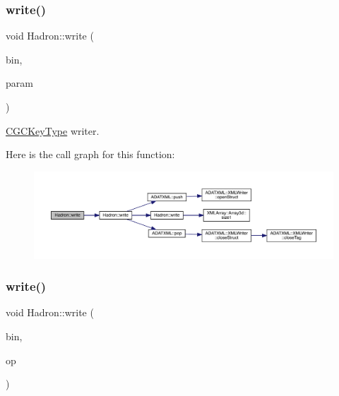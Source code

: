 \subsubsection{\texorpdfstring{write()}{write()}\hspace{0.1cm}{\footnotesize\ttfamily [12/95]}}
{\footnotesize\ttfamily void Hadron\+::write (\begin{DoxyParamCaption}\item[{\mbox{\hyperlink{classADATIO_1_1BinaryWriter}{Binary\+Writer}} \&}]{bin,  }\item[{const \mbox{\hyperlink{structHadron_1_1KeyCGCSU3__t}{Key\+C\+G\+C\+S\+U3\+\_\+t}} \&}]{param }\end{DoxyParamCaption})}



\mbox{\hyperlink{structHadron_1_1CGCKeyType}{C\+G\+C\+Key\+Type}} writer. 

Here is the call graph for this function\+:
\nopagebreak
\begin{figure}[H]
\begin{center}
\leavevmode
\includegraphics[width=350pt]{d1/daf/namespaceHadron_af206eaa349ec42352cb0a106dfd89c5b_cgraph}
\end{center}
\end{figure}
\mbox{\label{namespaceHadron_a44eb64f50cbbc947364a538026c97ee6}} 
\subsubsection{\texorpdfstring{write()}{write()}\hspace{0.1cm}{\footnotesize\ttfamily [13/95]}}
{\footnotesize\ttfamily void Hadron\+::write (\begin{DoxyParamCaption}\item[{\mbox{\hyperlink{classADATIO_1_1BinaryWriter}{Binary\+Writer}} \&}]{bin,  }\item[{const \mbox{\hyperlink{structHadron_1_1QuarkNum__t}{Quark\+Num\+\_\+t}} \&}]{op }\end{DoxyParamCaption})}



